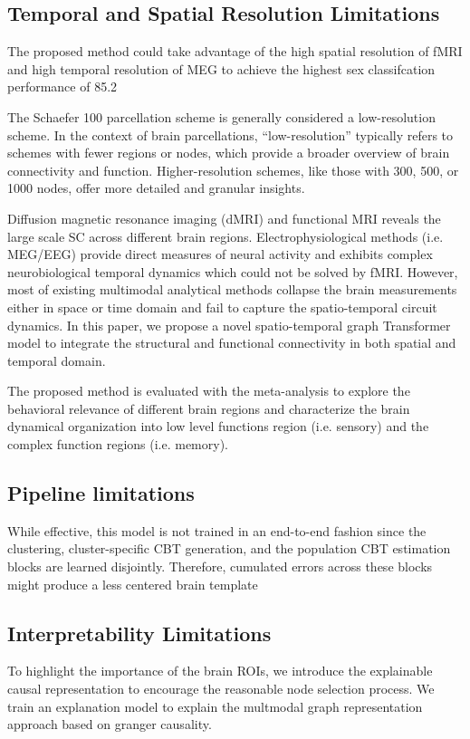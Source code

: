 \subsection{Temporal and Spatial Resolution Limitations}
The proposed method could take advantage of the high spatial 
resolution of fMRI and high temporal resolution of
MEG to achieve the highest sex classifcation performance of 85.2%
\cite{Zhao2022}

The Schaefer 100 parcellation scheme is generally considered a low-resolution 
scheme. In the context of brain parcellations, “low-resolution” typically 
refers to schemes with fewer regions or nodes, which provide a broader 
overview of brain connectivity and function. Higher-resolution schemes, 
like those with 300, 500, or 1000 nodes, offer more detailed and granular 
insights.

Diffusion magnetic resonance imaging (dMRI) and functional MRI reveals the large
scale SC across different brain regions. Electrophysiological methods (i.e.
MEG/EEG) provide direct measures of neural activity and exhibits complex 
neurobiological temporal dynamics which could not be solved by
fMRI. However, most of existing multimodal analytical methods collapse the brain 
measurements either in space or time domain and fail
to capture the spatio-temporal circuit dynamics. In this paper, we propose a novel 
spatio-temporal graph Transformer model to integrate the
structural and functional connectivity in both spatial and temporal domain.

The proposed method is evaluated with the meta-analysis to explore the
behavioral relevance of different brain regions and characterize the brain
dynamical organization into low level functions region (i.e. sensory) and the
complex function regions (i.e. memory).
\cite{Zhao2022a}

\subsection{Pipeline limitations}
While effective, this model is not trained in an end-to-end
fashion since the clustering, cluster-specific CBT generation, 
and the population CBT estimation blocks are learned
disjointly. Therefore, cumulated errors across these blocks
might produce a less centered brain template
\cite{Bessadok2022}

\subsection{Interpretability Limitations}
To highlight the importance of the brain ROIs, we introduce the explainable
causal representation to encourage the reasonable node selection process. We
train an explanation model to explain the multmodal graph representation approach based on granger causality.
\cite{Zhao2022}


